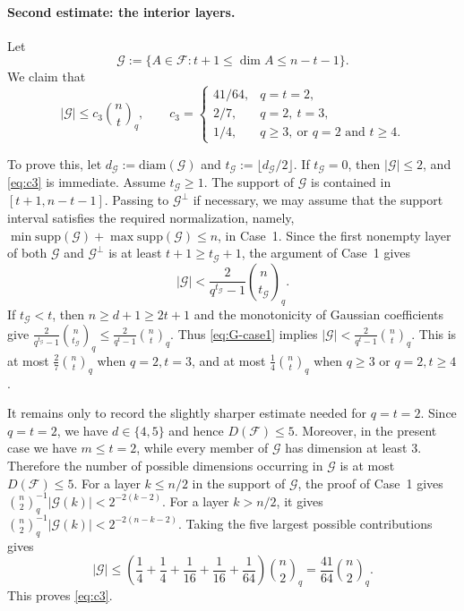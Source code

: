 \documentclass[11pt]{article}
\theoremstyle{definition}
\newcommand{\qbinom}[2]{\genfrac{(}{)}{0pt}{}{#1}{#2}_q}
\newcommand{\diam}{\mathrm{diam}}
\newcommand{\supp}{\mathrm{supp}}
\begin{document}
\paragraph{Second estimate: the interior layers.}

Let
\[
\mathcal G:=
\{A\in\mathcal F:t+1\le \dim A\le n-t-1\}.
\]
We claim that
\begin{equation}\label{eq:c3}
|\mathcal G|
\le
c_3\qbinom{n}{t},\qquad 
c_3=
\begin{cases}
41/64, & q=t=2,\\
2/7, & q=2,\ t=3,\\
1/4, & q\ge 3,\ \text{or }q=2\text{ and }t\ge 4.
\end{cases}
\end{equation}


To prove this, let $d_{\mathcal G}:=\diam(\mathcal G)$ and $t_{\mathcal G}:=\lfloor d_{\mathcal G}/2\rfloor$. 
If $t_{\mathcal G}=0$, then $|\mathcal G|\le 2$, and \eqref{eq:c3} is immediate. 
Assume $t_{\mathcal G}\ge 1$. 
The support of $\mathcal G$ is contained in $[t+1,n-t-1]$. 
Passing to $\mathcal G^\perp$ if necessary, we may assume that the support interval satisfies the required normalization, namely, $\min\supp(\mathcal G)+\max\supp(\mathcal G)\le n$, in Case~1. 
Since the first nonempty layer of both $\mathcal G$ and $\mathcal G^\perp$ is at least $t+1\ge t_{\mathcal G}+1$, the argument of Case~1 gives
\begin{equation}\label{eq:G-case1}
|\mathcal G|
<
\frac{2}{q^{t_{\mathcal G}}-1}\qbinom{n}{t_{\mathcal G}}.
\end{equation}
If \(t_{\mathcal G}<t\), then \(n\ge d+1\ge 2t+1\) and the monotonicity of Gaussian coefficients give
\(
\frac{2}{q^{t_{\mathcal G}}-1}\qbinom{n}{t_{\mathcal G}}
\le
\frac{2}{q^{t}-1}\qbinom{n}{t}.
\)
Thus \eqref{eq:G-case1} implies
\(
|\mathcal G|
<
\frac{2}{q^t-1}\qbinom{n}{t}.
\)
This is at most $\frac{2}{7}\qbinom{n}{t}$ when $q=2,t=3$, and at most $\frac14\qbinom{n}{t}$ when $q\ge 3$ or $q=2,t\ge 4$.

It remains only to record the slightly sharper estimate needed for $q=t=2$. 
Since $q=t=2$, we have $d\in\{4,5\}$ and hence $D(\mathcal F)\le 5$.
Moreover, in the present case we have $m\le t=2$, while every member of $\mathcal G$
has dimension at least $3$. Therefore the number of possible dimensions occurring in
$\mathcal G$ is at most $D(\mathcal F)\le 5$. 
For a layer $k\le n/2$ in the support of $\mathcal G$, the proof of Case~1 gives
\(
\qbinom{n}{2}^{-1}|\mathcal G(k)|
<
2^{-2(k-2)}.
\)
For a layer $k>n/2$, it gives
\(
\qbinom{n}{2}^{-1}|\mathcal G(k)|
<
2^{-2(n-k-2)}.
\)
Taking the five largest possible contributions gives
\[
|\mathcal G|
\le
\left(
\frac14+\frac14+\frac1{16}+\frac1{16}+\frac1{64}
\right)\qbinom{n}{2}
=
\frac{41}{64}\qbinom{n}{2}.
\]
This proves \eqref{eq:c3}.
\end{document}
